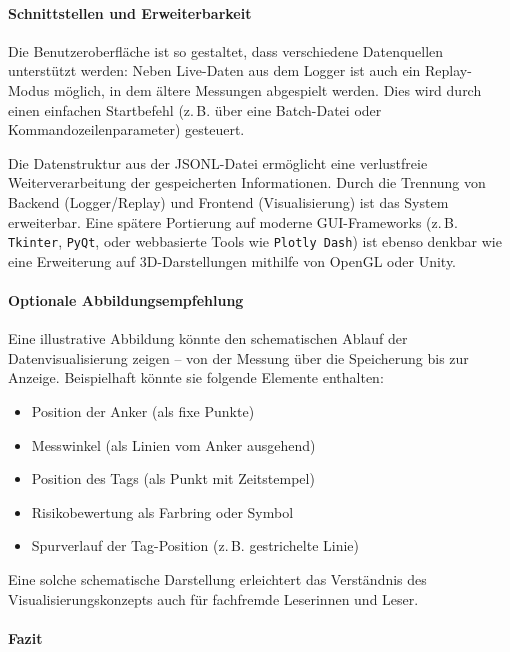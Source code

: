 \documentclass[a4paper, 12pt]{article} %
\begin{document}
\paragraph{Schnittstellen und Erweiterbarkeit}

Die Benutzeroberfläche ist so gestaltet, dass verschiedene Datenquellen unterstützt werden: Neben Live-Daten aus dem Logger ist auch ein 
Replay-Modus möglich, in dem ältere Messungen abgespielt werden. Dies wird durch einen einfachen Startbefehl (z.\,B. über eine Batch-Datei oder
 Kommandozeilenparameter) gesteuert.

Die Datenstruktur aus der \ac{JSONL}-Datei ermöglicht eine verlustfreie Weiterverarbeitung der gespeicherten Informationen. Durch die Trennung von 
Backend (Logger/Replay) und Frontend (Visualisierung) ist das System erweiterbar. Eine spätere Portierung auf moderne GUI-Frameworks 
(z.\,B. \texttt{Tkinter}, \texttt{PyQt}, oder webbasierte Tools wie \texttt{Plotly Dash}) ist ebenso denkbar wie eine Erweiterung auf 3D-Darstellungen 
mithilfe von OpenGL oder Unity.

\paragraph{Optionale Abbildungsempfehlung}

Eine illustrative Abbildung könnte den schematischen Ablauf der Datenvisualisierung zeigen – von der Messung über die Speicherung bis zur Anzeige. 
Beispielhaft könnte sie folgende Elemente enthalten:

\begin{itemize}
    \item Position der Anker (als fixe Punkte)
    \item Messwinkel (als Linien vom Anker ausgehend)
    \item Position des Tags (als Punkt mit Zeitstempel)
    \item Risikobewertung als Farbring oder Symbol
    \item Spurverlauf der Tag-Position (z.\,B. gestrichelte Linie)
\end{itemize}

Eine solche schematische Darstellung erleichtert das Verständnis des Visualisierungskonzepts auch für fachfremde Leserinnen und Leser.

\paragraph{Fazit}
\end{document}
